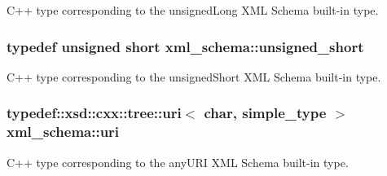 C++ type corresponding to the unsigned\-Long X\-M\-L Schema built-\/in type. 

\hypertarget{namespacexml__schema_a7fc7b4a846c512c370346e15dfdcecaa}{
\subsubsection[{unsigned\-\_\-short}]{\setlength{\rightskip}{0pt plus 5cm}typedef unsigned short {\bf xml\-\_\-schema\-::unsigned\-\_\-short}}}\label{namespacexml__schema_a7fc7b4a846c512c370346e15dfdcecaa}


C++ type corresponding to the unsigned\-Short X\-M\-L Schema built-\/in type. 

\hypertarget{namespacexml__schema_aad28b7e5769e04950db7f4bd15c163be}{
\subsubsection[{uri}]{\setlength{\rightskip}{0pt plus 5cm}typedef\-::xsd\-::cxx\-::tree\-::uri$<$ char, {\bf simple\-\_\-type} $>$ {\bf xml\-\_\-schema\-::uri}}}\label{namespacexml__schema_aad28b7e5769e04950db7f4bd15c163be}


C++ type corresponding to the any\-U\-R\-I X\-M\-L Schema built-\/in type. 

